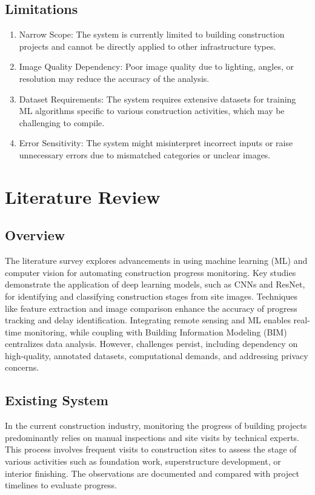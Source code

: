 \documentclass[12pt,a4paper]{report}
\begin{document}
\section{Limitations}
\label{sec:limitations-unique}
\begin{enumerate}
    \item Narrow Scope: The system is currently limited to building construction projects and cannot be directly applied to other infrastructure types.
    \item Image Quality Dependency: Poor image quality due to lighting, angles, or resolution may reduce the accuracy of the analysis.
    \item Dataset Requirements: The system requires extensive datasets for training ML algorithms specific to various construction activities, which may be challenging to compile.
    \item Error Sensitivity: The system might misinterpret incorrect inputs or raise unnecessary errors due to mismatched categories or unclear images.
\end{enumerate}


\chapter{Literature Review}

\section{Overview}
The literature survey explores advancements in using machine learning (ML) and computer vision for automating construction progress monitoring. Key studies demonstrate the application of deep learning models, such as CNNs and ResNet, for identifying and classifying construction stages from site images. Techniques like feature extraction and image comparison enhance the accuracy of progress tracking and delay identification. Integrating remote sensing and ML enables real-time monitoring, while coupling with Building Information Modeling (BIM) centralizes data analysis. However, challenges persist, including dependency on high-quality, annotated datasets, computational demands, and addressing privacy concerns.

\section{Existing System}
In the current construction industry, monitoring the progress of building projects predominantly relies on manual inspections and site visits by technical experts. This process involves frequent visits to construction sites to assess the stage of various activities such as foundation work, superstructure development, or interior finishing. The observations are documented and compared with project timelines to evaluate progress.
\end{document}
